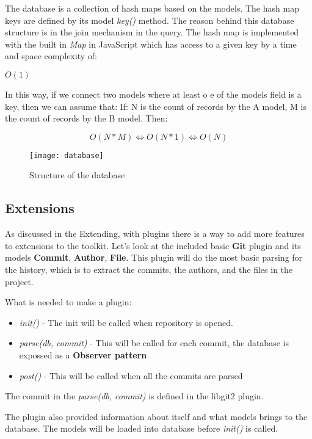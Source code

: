 The database is a collection of hash maps based on the models. The hash map keys are defined by its model \textit{key()} method.
The reason behind this database structure is in the join mechanism in the query. The hash map is implemented with the built in 
\textit{Map}\cite{map} in JavaScript which has access to a given key by a time and space complexity of:

\( O(1) \)

In this way, if we connect two models where at least o e of the models field is a key, then we can assume that:\newline
If: N is the count of records by the A model, M  is the count of records by the B model. Then:

\[O(N * M) \Leftrightarrow O(N * 1) \Leftrightarrow O(N)\]

\begin{figure}[H]
	\centering
	\texttt{[image: database]}
	\caption{Structure of the database}
	\label{fig:fig-help}
\end{figure}
\newpage

\subsection{Extensions}

As discussed in the Extending, with plugins there is a way to add more features to extensions to the toolkit.
Let's look at the included basic \textbf{Git} plugin and its models \textbf{Commit}, \textbf{Author}, \textbf{File}.
This plugin will do the most basic parsing for the history, which is to extract the commits, the authors, and the files
in the project.

What is needed to make a plugin:
\begin{itemize}
	\item \textit{init()} - The init will be called when repository is opened.
	\item \textit{parse(db, commit)} - This will be called for each commit, the database is expossed as a \textbf{Observer pattern}
	\item \textit{post()} - This will be called when all the commits are parsed
\end{itemize}

The commit in the \textit{parse(db, commit)} is defined in the libgit2 plugin.

The plugin also provided information about itself and what models brings to the database. 
The models will be loaded into database before \textit{init()} is called.

